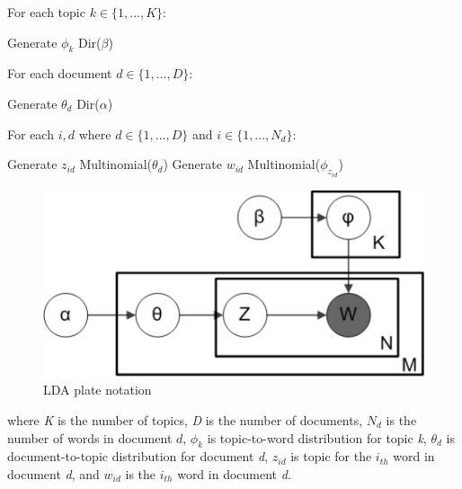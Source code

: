 \documentclass[10pt, conference, compsocconf]{IEEEtran}
\begin{document}

\begin{algorithmic}[1]
\STATE For each topic $k \in \{1,...,K\}$:
\begin{ALC@g} 
\STATE Generate $\phi_k$ \texttildelow{} Dir($\beta$) 
\end{ALC@g}
\STATE For each document $d \in \{1,...,D\}$:
\begin{ALC@g} 
\STATE Generate $\theta_d$ \texttildelow{} Dir($\alpha$) 
\end{ALC@g}
\STATE For each $i,d$ where $d \in \{1,...,D\}$ and $i \in \{1,...,N_d\}$:
\begin{ALC@g} 
\STATE Generate $z_{id}$ \texttildelow{} Multinomial($\theta_d$)
\STATE Generate $w_{id}$ \texttildelow{} Multinomial($\phi_{z_{id}}$)
\end{ALC@g}
\end{algorithmic}
\bigskip

\begin{figure}[b]
	\includegraphics[scale=0.5]{lda.png}
	\caption{LDA plate notation}
\label{fig_lda}
\end{figure}

\noindent where {\it K} is the number of topics, {\it D} is the number of documents, $N_d$ is the number of words in document $d$, $\phi_k$ is topic-to-word distribution for topic {\it k}, $\theta_d$ is document-to-topic distribution for document {\it d}, $z_{id}$ is topic for the $i_{th}$ word in document {\it d}, and $w_{id}$ is the $i_{th}$ word in document {\it d}.
\end{document}
